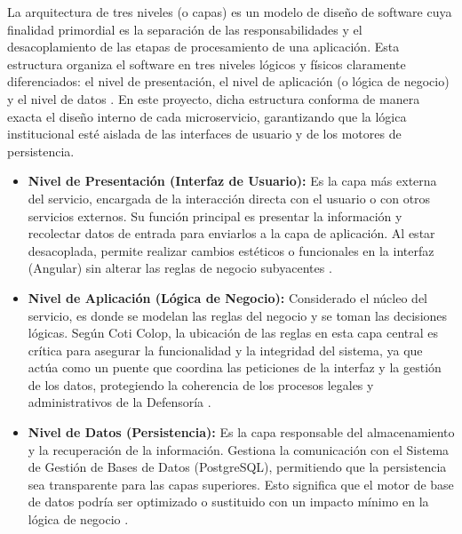 La arquitectura de tres niveles (o capas) es un modelo de diseño de software cuya finalidad primordial es la separación de las responsabilidades y el desacoplamiento de las etapas de procesamiento de una aplicación. Esta estructura organiza el software en tres niveles lógicos y físicos claramente diferenciados: el nivel de presentación, el nivel de aplicación (o lógica de negocio) y el nivel de datos \cite{33} \cite{40} . En este proyecto, dicha estructura conforma de manera exacta el diseño interno de cada microservicio, garantizando que la lógica institucional esté aislada de las interfaces de usuario y de los motores de persistencia.

\begin{itemize}
\item \textbf{Nivel de Presentación (Interfaz de Usuario):} Es la capa más externa del servicio, encargada de la interacción directa con el usuario o con otros servicios externos. Su función principal es presentar la información y recolectar datos de entrada para enviarlos a la capa de aplicación. Al estar desacoplada, permite realizar cambios estéticos o funcionales en la interfaz (Angular) sin alterar las reglas de negocio subyacentes \cite{33} \cite{40} .

\item \textbf{Nivel de Aplicación (Lógica de Negocio):} Considerado el núcleo del servicio, es donde se modelan las reglas del negocio y se toman las decisiones lógicas. Según Coti Colop, la ubicación de las reglas en esta capa central es crítica para asegurar la funcionalidad y la integridad del sistema, ya que actúa como un puente que coordina las peticiones de la interfaz y la gestión de los datos, protegiendo la coherencia de los procesos legales y administrativos de la Defensoría \cite{33} .

\item \textbf{Nivel de Datos (Persistencia):} Es la capa responsable del almacenamiento y la recuperación de la información. Gestiona la comunicación con el Sistema de Gestión de Bases de Datos (PostgreSQL), permitiendo que la persistencia sea transparente para las capas superiores. Esto significa que el motor de base de datos podría ser optimizado o sustituido con un impacto mínimo en la lógica de negocio \cite{42} .

\end{itemize}

